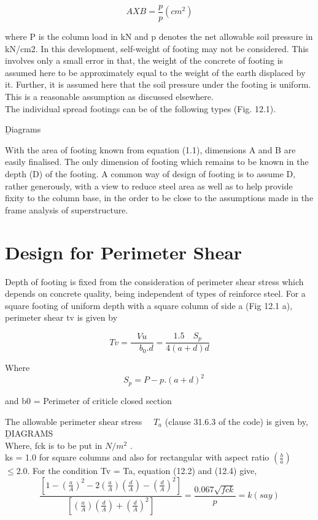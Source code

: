 \documentclass{book}
\begin{document}
\begin{equation}
AXB =\frac{p}{p} (cm^2)
\end{equation}

where P is the column load in kN and p denotes the net allowable soil pressure in kN/cm2. In
this development, self-weight of footing may not be considered. This involves only a small error
in that, the weight of the concrete of footing is assumed here to be approximately equal to the
weight of the earth displaced by it. Further, it is assumed here that the soil pressure under
the footing is uniform. This is a reasonable assumption as discussed elsewhere.\\
The individual spread footings can be of the following types (Fig. 12.1).
\newpage

\b Diagrams
\par With the area of footing known from equation (1.1), dimensions A and B are easily finalised. The only dimension of footing which remains to be known in the depth (D) of the footing. A common way of design of footing is to assume D, rather generously, with a view to reduce steel area as well as to help provide fixity to the column base, in the order to be close to the assumptions made in the frame analysis of superstructure.

\section{Design for Perimeter Shear}
Depth of footing is fixed from the consideration of perimeter shear stress which depends on concrete quality, being independent of types of reinforce steel. For a square footing of uniform depth with a square column of side a (Fig 12.1 a), perimeter shear tv is given by

\begin{equation}
Tv = \frac{Vu} {\quad{b_0}.d}
=\frac{1.5 \quad S_p} {4(a+d)d}
\end{equation}

Where
\begin{equation}
\quad S_p = P-p . (a+d)^2
\end{equation}

and b0 = Perimeter of criticle closed section
\par The allowable perimeter shear stress
$\quad{T_a}$
(clause 31.6.3 of the code) is given by,
\newpage
\b DIAGRAMS \\
Where, fck is to be put in $N/m^2$ .\\
 ks = 1.0 for square columns and also for rectangular with aspect ratio  $\left( \frac{b}{a} \right)$ $\leq {2.0}$. For the condition Tv = Ta, equation (12.2) and (12.4) give,
\begin{equation}
\frac{\left[1-\left( \frac{a}{A} \right)^2-2\left(\frac{a}{A}\right)\left(\frac{d}{A}\right)-\left(\frac{d}{A} \right)^2 \right]}
{\left[\left(\frac{a}{A}\right)\left(\frac{d}{A}\right)+\left(\frac{d}{A}\right)^2 \right]}
=\frac{0.067\sqrt{fck}}{p}
=k(say)
\end{equation}
\end{document}
